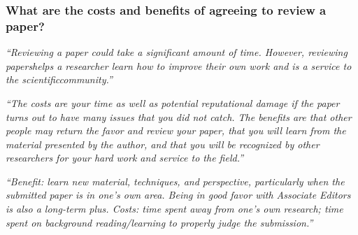 \documentclass[12pt]{beamer}
\newcommand\ans[1]{{\it ``#1''}}
\newcommand\gap{\vspace{5mm}}
\begin{document}
\begin{frame}










\end{frame}
\begin{frame}  %
  \frametitle{ What are the costs and benefits of agreeing to review a paper?}


  \ans{Reviewing a paper could take a significant amount of time.  However, reviewing papershelps a researcher learn how to improve their own work and is a service to the scientificcommunity.}

  \gap
  
  \ans{The costs are your time as well as potential reputational damage if the paper turns out to have many issues that you did not catch.  The benefits are that other people may return the favor and review your paper, that you will learn from the material presented by the author, and that you will be recognized by other researchers for your hard work and service to the field.}

  \ans{Benefit:  learn new material, techniques, and perspective, particularly when the submitted paper is in one’s own area.  Being in good favor with Associate Editors is also a  long-term  plus.   Costs:  time  spent  away  from  one’s  own  research;  time  spent  on background reading/learning to properly judge the submission.}


\end{frame}
\end{document}
